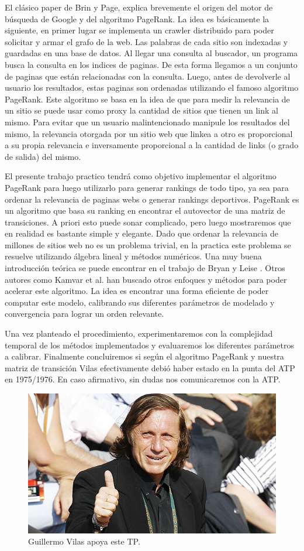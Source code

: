 El clásico paper de Brin y Page,  \cite{Brin1998} explica brevemente el origen del motor de búsqueda de Google y del algoritmo PageRank. La idea es básicamente la siguiente, en primer lugar se implementa un crawler distribuido para poder solicitar y armar el grafo de la web. Las palabras de cada sitio son indexadas y guardadas en una base de datos. Al llegar una consulta al buscador, un programa busca la consulta en los indices de paginas. De esta forma llegamos a un conjunto de paginas que están relacionadas con la consulta. Luego, antes de devolverle al usuario los resultados, estas paginas son ordenadas utilizando el famoso algoritmo PageRank. Este algoritmo se basa en la idea de que para medir la relevancia de un sitio se puede usar como proxy la cantidad de sitios que tienen un link al mismo. Para evitar que un usuario malintencionado manipule los resultados del mismo, la relevancia otorgada por un sitio web que linkea a otro es proporcional a su propia relevancia e inversamente proporcional a la cantidad de links (o grado de salida) del mismo.

El presente trabajo practico tendrá como objetivo implementar el algoritmo PageRank para luego utilizarlo para generar rankings de todo tipo, ya sea para ordenar la relevancia de paginas webs o generar rankings deportivos. PageRank es un algoritmo que basa su ranking en encontrar el autovector de una matriz de transiciones. A priori esto puede sonar complicado, pero luego mostraremos que en realidad es bastante simple y elegante. Dado que ordenar la relevancia de millones de sitios web no es un problema trivial, en la practica este problema se resuelve utilizando álgebra lineal y métodos numéricos. Una muy buena introducción teórica se puede encontrar en el trabajo de Bryan y Leise \cite{Bryan2006}. Otros autores como Kamvar et al. \cite{Kamvar2003} han buscado otros enfoques y métodos para poder acelerar este algoritmo. La idea es encontrar una forma eficiente de poder computar este modelo, calibrando sus diferentes parámetros de modelado y convergencia para lograr un orden relevante. 

Una vez planteado el procedimiento, experimentaremos con la complejidad temporal de los métodos implementados y evaluaremos los diferentes parámetros a calibrar. Finalmente concluiremos si según el algoritmo PageRank y nuestra matriz de transición Vilas efectivamente debió haber estado en la punta del ATP en 1975/1976. En caso afirmativo, sin dudas nos comunicaremos con la ATP.

\begin{figure}[H]
  \centering
  \includegraphics[scale=0.5]{images/vilasaprueba}
  \caption{Guillermo Vilas apoya este TP.}
\end{figure}